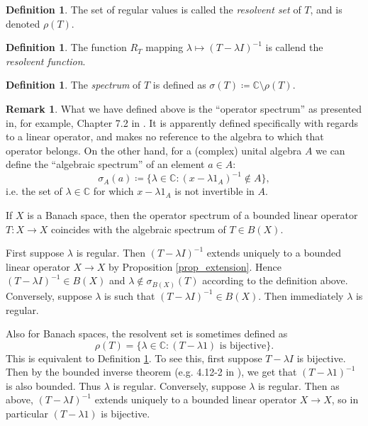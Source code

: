 \documentclass{dcthesis}
\numberwithin{equation}{section}
\numberwithin{equation}{section}
\theoremstyle{definition}
\newtheorem{definition}[equation]{Definition}
\newtheorem{remark}[equation]{Remark}
\begin{document}
\begin{definition} %
\label{def_resolvent_set}
	The set of regular values is called the \emph{resolvent set} of $T$, and is denoted $\rho(T)$.
\end{definition}

\begin{definition} %
	The function $R_T$ mapping $\lambda \mapsto (T-\lambda I)^{-1}$ is callend the \emph{resolvent function}.
\end{definition}

\begin{definition} %
\label{def_spectrum}
	The \emph{spectrum} of $T$ is defined as $\sigma(T) \coloneqq \mathbb{C} \setminus \rho(T)$. 
\end{definition}

\begin{remark}
\label{rmk_banach_space_spectrum_def_equivalent}
	What we have defined above is the ``operator spectrum'' as presented in, for example, Chapter 7.2 in \cite{kreyszig_1989}. It is apparently defined specifically with regards to a linear operator, and makes no reference to the algebra to which that operator belongs. On the other hand, for a (complex) unital algebra $A$ we can define the ``algebraic spectrum'' of an element $a\in A$:
	\begin{equation*}
		\sigma_A(a) \coloneqq \{\lambda\in\mathbb{C} : (x-\lambda 1_A)^{-1}\not\in A\},
	\end{equation*}
	i.e. the set of $\lambda\in\mathbb{C}$ for which $x-\lambda 1_A$ is not invertible in $A$.

	If $X$ is a Banach space, then the operator spectrum of a bounded linear operator $T:X\to X$ coincides with the algebraic spectrum of $T\in B(X)$. 

	First suppose $\lambda$ is regular. Then $(T-\lambda I)^{-1}$ extends uniquely to a bounded linear operator $X\to X$ by Proposition \ref{prop_extension}. Hence $(T-\lambda I)^{-1}\in B(X)$ and $\lambda\not\in\sigma_{B(X)}(T)$ according to the definition above. Conversely, suppose $\lambda$ is such that $(T-\lambda I)^{-1}\in B(X)$. Then immediately $\lambda$ is regular.

	Also for Banach spaces, the resolvent set is sometimes defined as 
	\begin{equation*}
		\rho(T) = \{ \lambda\in\mathbb{C} : (T-\lambda 1) \text{ is bijective} \}.
	\end{equation*}
	This is equivalent to Definition \ref{def_resolvent_set}. To see this, first suppose $T-\lambda I$ is bijective. Then by the bounded inverse theorem (e.g. 4.12-2 in \cite{kreyszig_1989}), we get that $(T-\lambda 1)^{-1}$ is also bounded. Thus $\lambda$ is regular. Conversely, suppose $\lambda$ is regular. Then as above, $(T-\lambda I)^{-1}$ extends uniquely to a bounded linear operator $X\to X$, so in particular $(T-\lambda 1)$ is bijective.
\end{remark}
\end{document}
